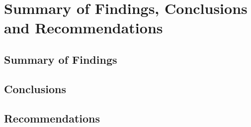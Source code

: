 \documentclass[../../1_thesis]{subfiles}
\begin{document}
\chapter{Summary of Findings, Conclusions and Recommendations}

\section{Summary of Findings}

\section{Conclusions}

\section{Recommendations}
\end{document}
